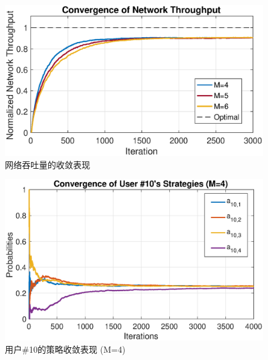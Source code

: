 
\begin{figure}[!t]
		\centering
		\includegraphics[scale=0.65]{./pic/conv_ch3.eps}
		\caption{网络吞吐量的收敛表现}\label{fg:conv1}
\end{figure}
\begin{figure}[!t]
		\centering
		\includegraphics[scale=0.64]{./pic/str_conv4.eps}
		\caption{用户\#10的策略收敛表现 (M=4)}\label{fg:conv2}
\end{figure}



